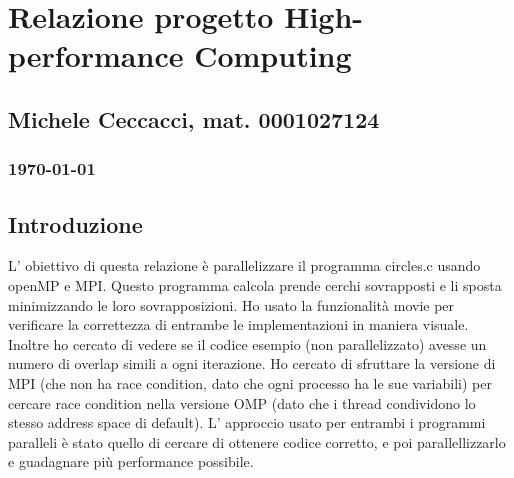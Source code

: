 \documentclass[a4paper,11pt, twoside]{report}
\begin{document}
\section*{Relazione progetto High-performance Computing}
\subsection*{Michele Ceccacci, mat. 0001027124}
\subsubsection*{\today}

\subsection*{Introduzione}
L' obiettivo di questa relazione è parallelizzare il programma circles.c usando openMP e MPI. 
Questo programma calcola prende cerchi sovrapposti e li sposta minimizzando le loro sovrapposizioni.
Ho usato la funzionalità movie per verificare la correttezza di entrambe le implementazioni in maniera visuale. 
Inoltre ho cercato di vedere se il codice esempio (non parallelizzato) avesse un numero di overlap simili a ogni iterazione. Ho cercato di sfruttare la versione di MPI (che non ha race condition, dato che ogni processo ha le sue variabili) 
per cercare race condition nella versione OMP (dato che i thread condividono lo stesso address space di default). 
L' approccio usato per entrambi i programmi paralleli è stato quello di cercare di ottenere codice corretto,
e poi parallellizzarlo e guadagnare più performance possibile.
\end{document}
